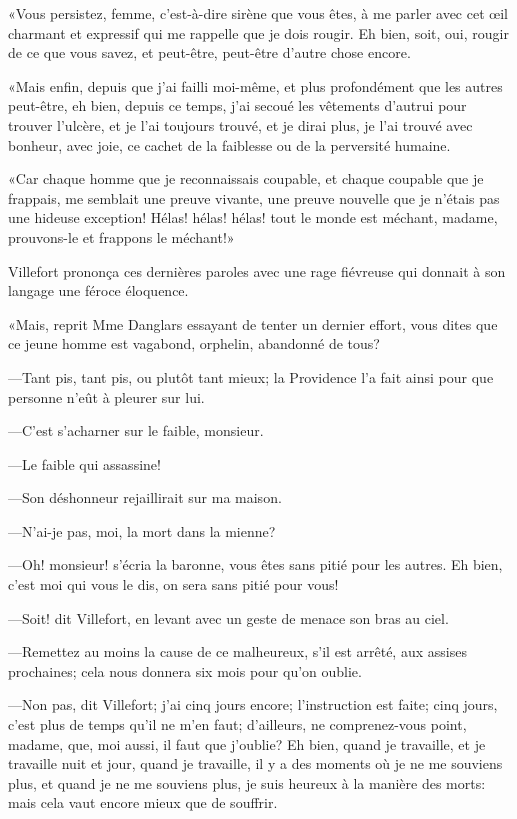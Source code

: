 «Vous persistez, femme, c'est-à-dire sirène que vous êtes, à me parler avec cet œil charmant et expressif qui me rappelle que je dois rougir. Eh bien, soit, oui, rougir de ce que vous savez, et peut-être, peut-être d'autre chose encore. 

«Mais enfin, depuis que j'ai failli moi-même, et plus profondément que les autres peut-être, eh bien, depuis ce temps, j'ai secoué les vêtements d'autrui pour trouver l'ulcère, et je l'ai toujours trouvé, et je dirai plus, je l'ai trouvé avec bonheur, avec joie, ce cachet de la faiblesse ou de la perversité humaine. 

«Car chaque homme que je reconnaissais coupable, et chaque coupable que je frappais, me semblait une preuve vivante, une preuve nouvelle que je n'étais pas une hideuse exception! Hélas! hélas! hélas! tout le monde est méchant, madame, prouvons-le et frappons le méchant!» 

Villefort prononça ces dernières paroles avec une rage fiévreuse qui donnait à son langage une féroce éloquence. 

«Mais, reprit Mme Danglars essayant de tenter un dernier effort, vous dites que ce jeune homme est vagabond, orphelin, abandonné de tous? 

—Tant pis, tant pis, ou plutôt tant mieux; la Providence l'a fait ainsi pour que personne n'eût à pleurer sur lui. 

—C'est s'acharner sur le faible, monsieur. 

—Le faible qui assassine! 

—Son déshonneur rejaillirait sur ma maison. 

—N'ai-je pas, moi, la mort dans la mienne? 

—Oh! monsieur! s'écria la baronne, vous êtes sans pitié pour les autres. Eh bien, c'est moi qui vous le dis, on sera sans pitié pour vous! 

—Soit! dit Villefort, en levant avec un geste de menace son bras au ciel. 

—Remettez au moins la cause de ce malheureux, s'il est arrêté, aux assises prochaines; cela nous donnera six mois pour qu'on oublie. 

—Non pas, dit Villefort; j'ai cinq jours encore; l'instruction est faite; cinq jours, c'est plus de temps qu'il ne m'en faut; d'ailleurs, ne comprenez-vous point, madame, que, moi aussi, il faut que j'oublie? Eh bien, quand je travaille, et je travaille nuit et jour, quand je travaille, il y a des moments où je ne me souviens plus, et quand je ne me souviens plus, je suis heureux à la manière des morts: mais cela vaut encore mieux que de souffrir. 

